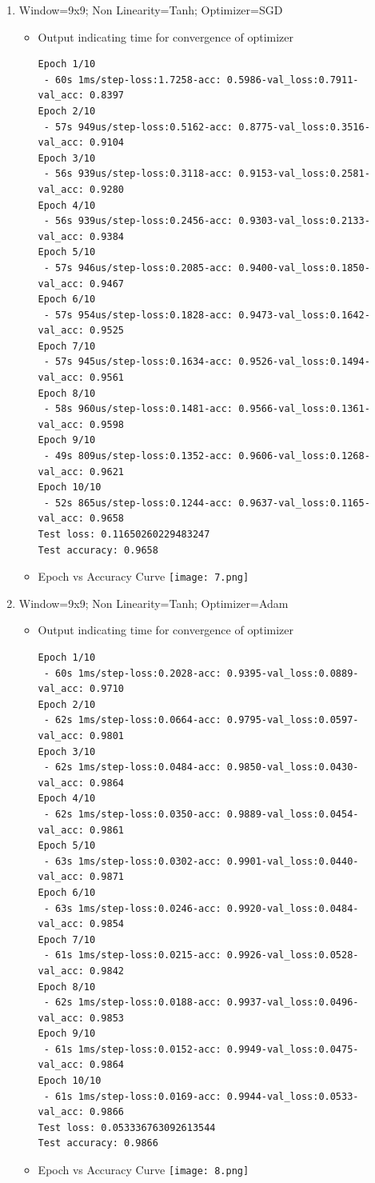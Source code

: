 \documentclass{article}
\begin{document}
\begin{enumerate}
\item Window=9x9; Non Linearity=Tanh; Optimizer=SGD
\begin{itemize}
    \item Output indicating time for convergence of optimizer\newline
    \begin{verbatim}
Epoch 1/10
 - 60s 1ms/step-loss:1.7258-acc: 0.5986-val_loss:0.7911-val_acc: 0.8397
Epoch 2/10
 - 57s 949us/step-loss:0.5162-acc: 0.8775-val_loss:0.3516-val_acc: 0.9104
Epoch 3/10
 - 56s 939us/step-loss:0.3118-acc: 0.9153-val_loss:0.2581-val_acc: 0.9280
Epoch 4/10
 - 56s 939us/step-loss:0.2456-acc: 0.9303-val_loss:0.2133-val_acc: 0.9384
Epoch 5/10
 - 57s 946us/step-loss:0.2085-acc: 0.9400-val_loss:0.1850-val_acc: 0.9467
Epoch 6/10
 - 57s 954us/step-loss:0.1828-acc: 0.9473-val_loss:0.1642-val_acc: 0.9525
Epoch 7/10
 - 57s 945us/step-loss:0.1634-acc: 0.9526-val_loss:0.1494-val_acc: 0.9561
Epoch 8/10
 - 58s 960us/step-loss:0.1481-acc: 0.9566-val_loss:0.1361-val_acc: 0.9598
Epoch 9/10
 - 49s 809us/step-loss:0.1352-acc: 0.9606-val_loss:0.1268-val_acc: 0.9621
Epoch 10/10
 - 52s 865us/step-loss:0.1244-acc: 0.9637-val_loss:0.1165-val_acc: 0.9658
Test loss: 0.11650260229483247
Test accuracy: 0.9658
\end{verbatim}
    \item Epoch vs Accuracy Curve\newline
    \texttt{[image: 7.png]}
\end{itemize}

\item Window=9x9; Non Linearity=Tanh; Optimizer=Adam
\begin{itemize}
    \item Output indicating time for convergence of optimizer\newline
\begin{verbatim}
Epoch 1/10
 - 60s 1ms/step-loss:0.2028-acc: 0.9395-val_loss:0.0889-val_acc: 0.9710
Epoch 2/10
 - 62s 1ms/step-loss:0.0664-acc: 0.9795-val_loss:0.0597-val_acc: 0.9801
Epoch 3/10
 - 62s 1ms/step-loss:0.0484-acc: 0.9850-val_loss:0.0430-val_acc: 0.9864
Epoch 4/10
 - 62s 1ms/step-loss:0.0350-acc: 0.9889-val_loss:0.0454-val_acc: 0.9861
Epoch 5/10
 - 63s 1ms/step-loss:0.0302-acc: 0.9901-val_loss:0.0440-val_acc: 0.9871
Epoch 6/10
 - 63s 1ms/step-loss:0.0246-acc: 0.9920-val_loss:0.0484-val_acc: 0.9854
Epoch 7/10
 - 61s 1ms/step-loss:0.0215-acc: 0.9926-val_loss:0.0528-val_acc: 0.9842
Epoch 8/10
 - 62s 1ms/step-loss:0.0188-acc: 0.9937-val_loss:0.0496-val_acc: 0.9853
Epoch 9/10
 - 61s 1ms/step-loss:0.0152-acc: 0.9949-val_loss:0.0475-val_acc: 0.9864
Epoch 10/10
 - 61s 1ms/step-loss:0.0169-acc: 0.9944-val_loss:0.0533-val_acc: 0.9866
Test loss: 0.053336763092613544
Test accuracy: 0.9866
\end{verbatim}
    \item Epoch vs Accuracy Curve\newline
    \texttt{[image: 8.png]}
\end{itemize}

\end{enumerate}
\end{document}
